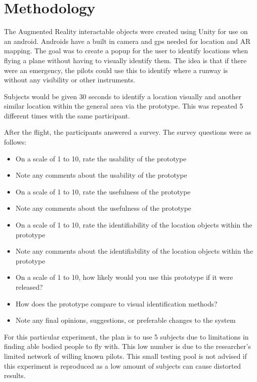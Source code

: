 \documentclass[journal]{vgtc}                %
\begin{document}
\section{Methodology}

The Augmented Reality interactable objects were created using Unity for use on an android. Androids have a built in camera and gps needed for location and AR mapping. The goal was to create a popup for the user to identify locations when flying a plane without having to visually identify them. The idea is that if there were an emergency, the pilots could use this to identify where a runway is without any visibility or other instruments.

Subjects would be given 30 seconds to identify a location visually and another similar location within the general area via the prototype. This was repeated 5 different times with the same participant. 

After the flight, the participants answered a survey. The survey questions were as follows:

\begin{itemize}
  \item On a scale of 1 to 10, rate the usability of the prototype
  \item Note any comments about the usability of the prototype
  \item On a scale of 1 to 10, rate the usefulness of the prototype
  \item Note any comments about the usefulness of the prototype
  \item On a scale of 1 to 10, rate the identifiability of the location objects within the prototype
  \item Note any comments about the identifiability of the location objects within the prototype
  \item On a scale of 1 to 10, how likely would you use this prototype if it were released?
  \item How does the prototype compare to visual identification methods?
  \item Note any final opinions, suggestions, or preferable changes to the system
\end{itemize}


For this particular experiment, the plan is to use 5 subjects due to limitations in finding able bodied people to fly with. This low number is due to the researcher’s limited network of willing known pilots. This small testing pool is not advised if this experiment is reproduced as a low amount of subjects can cause distorted results.
\end{document}

